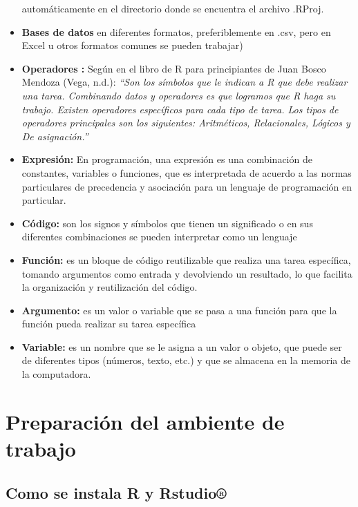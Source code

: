 \documentclass[
  letterpaper,
  DIV=11,
  numbers=noendperiod]{scrreprt}
\begin{document}
\begin{itemize}
  automáticamente en el directorio donde se encuentra el archivo .RProj.
\item
  \textbf{Bases de datos} en diferentes formatos, preferiblemente en
  .csv, pero en Excel u otros formatos comunes se pueden trabajar)
\item
  \textbf{Operadores :} Según en el libro de R para principiantes de
  Juan Bosco Mendoza (Vega, n.d.): \emph{``Son los símbolos que le
  indican a R que debe realizar una tarea. Combinando datos y operadores
  es que logramos que R haga su trabajo. Existen operadores específicos
  para cada tipo de tarea. Los tipos de operadores principales son los
  siguientes: Aritméticos, Relacionales, Lógicos y De asignación.''}
\item
  \textbf{Expresión:} En programación, una expresión es una combinación
  de constantes, variables o funciones, que es interpretada de acuerdo a
  las normas particulares de precedencia y asociación para un lenguaje
  de programación en particular.
\item
  \textbf{Código:} son los signos y símbolos que tienen un significado o
  en sus diferentes combinaciones se pueden interpretar como un lenguaje
\item
  \textbf{Función:} es un bloque de código reutilizable que realiza una
  tarea específica, tomando argumentos como entrada y devolviendo un
  resultado, lo que facilita la organización y reutilización del código.
\item
  \textbf{Argumento:} es un valor o variable que se pasa a una función
  para que la función pueda realizar su tarea específica
\item
  \textbf{Variable:} es un nombre que se le asigna a un valor o objeto,
  que puede ser de diferentes tipos (números, texto, etc.) y que se
  almacena en la memoria de la computadora.
\end{itemize}


\chapter{Preparación del ambiente de
trabajo}\label{preparaciuxf3n-del-ambiente-de-trabajo}

\section{Como se instala R y
Rstudio®}\label{como-se-instala-r-y-rstudio}
\end{document}

